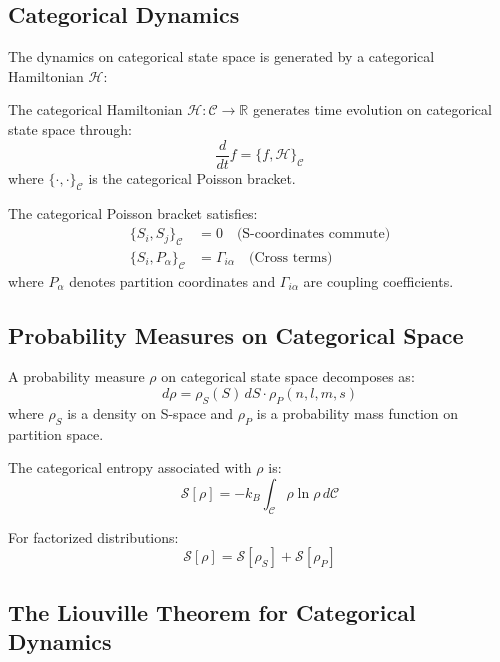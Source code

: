 \subsection{Categorical Dynamics}

The dynamics on categorical state space is generated by a categorical Hamiltonian $\mathcal{H}$:

\begin{definition}
The categorical Hamiltonian $\mathcal{H}: \mathcal{C} \to \mathbb{R}$ generates time evolution on categorical state space through:
\begin{equation}
    \frac{d}{dt}f = \{f, \mathcal{H}\}_{\mathcal{C}}
\end{equation}
where $\{\cdot, \cdot\}_{\mathcal{C}}$ is the categorical Poisson bracket.
\end{definition}

The categorical Poisson bracket satisfies:
\begin{align}
    \{S_i, S_j\}_{\mathcal{C}} &= 0 \quad \text{(S-coordinates commute)} \\
    \{S_i, P_\alpha\}_{\mathcal{C}} &= \Gamma_{i\alpha} \quad \text{(Cross terms)}
\end{align}
where $P_\alpha$ denotes partition coordinates and $\Gamma_{i\alpha}$ are coupling coefficients.

\subsection{Probability Measures on Categorical Space}

A probability measure $\rho$ on categorical state space decomposes as:
\begin{equation}
    d\rho = \rho_S(S) \, dS \cdot \rho_P(n, l, m, s)
\end{equation}
where $\rho_S$ is a density on S-space and $\rho_P$ is a probability mass function on partition space.

The categorical entropy associated with $\rho$ is:
\begin{equation}
    \mathcal{S}[\rho] = -k_B \int_{\mathcal{C}} \rho \ln \rho \, d\mathcal{C}
\end{equation}

For factorized distributions:
\begin{equation}
    \mathcal{S}[\rho] = \mathcal{S}[\rho_S] + \mathcal{S}[\rho_P]
\end{equation}

\subsection{The Liouville Theorem for Categorical Dynamics}

